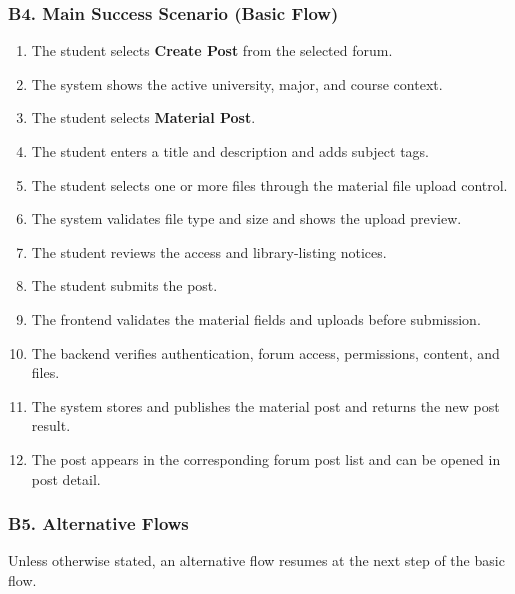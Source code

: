 \documentclass[12pt]{article}
\begin{document}
\hypertarget{sec:b4-main-success-scenario-basic-flow}{}
\subsubsection*{B4. Main Success Scenario (Basic Flow)}
\par\medskip

\begin{enumerate}
\item The student selects \textbf{Create Post} from the selected forum.
\item The system shows the active university, major, and course context.
\item The student selects \textbf{Material Post}.
\item The student enters a title and description and adds subject tags.
\item The student selects one or more files through the material file upload control.
\item The system validates file type and size and shows the upload preview.
\item The student reviews the access and library-listing notices.
\item The student submits the post.
\item The frontend validates the material fields and uploads before submission.
\item The backend verifies authentication, forum access, permissions, content, and files.
\item The system stores and publishes the material post and returns the new post result.
\item The post appears in the corresponding forum post list and can be opened in post detail.
\end{enumerate}
\par\medskip

\hypertarget{sec:b5-alternative-flows}{}
\subsubsection*{B5. Alternative Flows}
\par\medskip

Unless otherwise stated, an alternative flow resumes at the next step of the basic flow.
\par\medskip

\hypertarget{sec:a1-preview-before-submission}{}
\end{document}
